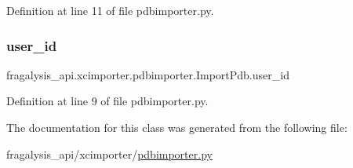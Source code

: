 Definition at line 11 of file pdbimporter.\+py.

\mbox{\label{classfragalysis__api_1_1xcimporter_1_1pdbimporter_1_1_import_pdb_a4e8f2945727ef48feba2a568eab43b3b}} 
\subsubsection{\texorpdfstring{user\+\_\+id}{user\_id}}
{\footnotesize\ttfamily fragalysis\+\_\+api.\+xcimporter.\+pdbimporter.\+Import\+Pdb.\+user\+\_\+id}



Definition at line 9 of file pdbimporter.\+py.



The documentation for this class was generated from the following file\+:\begin{DoxyCompactItemize}
\item 
fragalysis\+\_\+api/xcimporter/\hyperlink{pdbimporter_8py}{pdbimporter.\+py}\end{DoxyCompactItemize}
